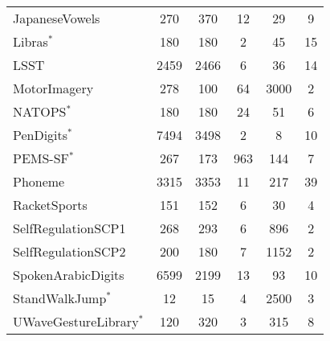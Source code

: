 \begin{table}[h]
{\begin{tabular}{lccccc}
JapaneseVowels & 270 & 370 & 12 & 29 & 9 \\

Libras$^*$ & 180 & 180 & 2 & 45 & 15 \\

LSST & 2459 & 2466 & 6 & 36 & 14 \\

MotorImagery & 278 & 100 & 64 & 3000 & 2 \\

NATOPS$^*$ & 180 & 180 & 24 & 51 & 6 \\

PenDigits$^*$ & 7494 & 3498 & 2 & 8 & 10 \\

PEMS-SF$^*$ & 267 & 173 & 963 & 144 & 7 \\

Phoneme & 3315 & 3353 & 11 & 217 & 39 \\

RacketSports & 151 & 152 & 6 & 30 & 4 \\

SelfRegulationSCP1 & 268 & 293 & 6 & 896 & 2 \\

SelfRegulationSCP2 & 200 & 180 & 7 & 1152 & 2 \\

SpokenArabicDigits & 6599 & 2199 & 13 & 93 & 10 \\

StandWalkJump$^*$ & 12 & 15 & 4 & 2500 & 3 \\

UWaveGestureLibrary$^*$ & 120 & 320 & 3 & 315 & 8 \\


\bottomrule
    \end{tabular}}
    \label{tab:uea_statistics}
\end{table}


\begin{table}[h]
    \centering
    \caption{Statistics of evaluated anomaly detection datasets.}
    \label{tab:ad_statistics}
\end{table}

